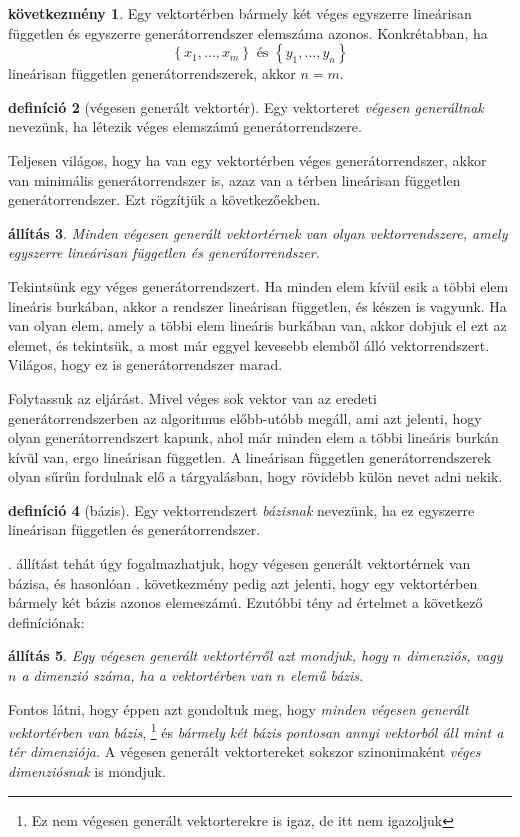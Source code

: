 \documentclass[9pt,showtrims]{memoir}
\makeatletter
\let\Aref\relax
\renewenvironment{proof}[1][\proofname]
    {\par\pushQED{\qed}%
    \normalfont \topsep6\p@\@plus6\p@\relax
    \trivlist
    \item[\hskip\labelsep
        \itshape
    #1\@addpunct{:}]\ignorespaces}
    {\popQED\endtrivlist\@endpefalse}
\theoremstyle{plain}
\newtheorem{proposition}{állítás}[chapter]
\theoremstyle{remark}
\theoremstyle{definition}
\newtheorem{definition}[proposition]{definíció}
\newtheorem{corollary}[proposition]{következmény}
\makeatother
\begin{document}
\begin{corollary}
    Egy vektortérben bármely két véges egyszerre lineárisan független és egyszerre generátorrendszer elemszáma azonos.
    Konkrétabban, ha
    \[
        \left\{ x_1,\dots,x_m \right\} \text{ és } \left\{ y_1,\dots,y_n \right\}
    \]
    lineárisan független generátorrendszerek, akkor $n=m$.
    \label{co:baziselemszam}
\end{corollary}
\begin{definition}[végesen generált vektortér]
    Egy vektorteret \emph{végesen generáltnak} nevezünk,
    ha létezik véges elemszámú generátorrendszere.
\end{definition}
Teljesen világos, hogy ha van egy vektortérben véges generátorrendszer,
akkor van minimális generátorrendszer is, azaz van a térben lineárisan független generátorrendszer.
Ezt rögzítjük a következőekben.
\begin{proposition}
    Minden végesen generált vektortérnek van olyan vektorrendszere, 
    amely egyszerre lineárisan független és generátorrendszer.
    \label{pr:bazisletezik}
\end{proposition}
\begin{proof}
    Tekintsünk egy véges generátorrendszert.
    Ha minden elem kívül esik a többi elem lineáris burkában, akkor a rendszer lineárisan független, és készen is vagyunk.
    Ha van olyan elem, amely a többi elem lineáris burkában van, akkor dobjuk el ezt az elemet, és tekintsük, a most már
    eggyel kevesebb elemből álló vektorrendszert. 
    Világos, hogy ez is generátorrendszer marad.

    Folytassuk az eljárást.
    Mivel véges sok vektor van az eredeti generátorrendszerben az algoritmus előbb-utóbb megáll,
    ami azt jelenti, hogy olyan generátorrendszert kapunk, 
    ahol már minden elem a többi lineáris burkán kívül van,
    ergo lineárisan független.
\end{proof}
A lineárisan független generátorrendszerek olyan sűrűn fordulnak elő a tárgyalásban,
hogy rövidebb külön nevet adni nekik.
\begin{definition}[bázis]
    Egy vektorrendszert \emph{bázisnak} nevezünk, ha ez egyszerre lineárisan független és generátorrendszer.
\end{definition}
\Aref{pr:bazisletezik}. állítást tehát úgy fogalmazhatjuk, hogy végesen generált vektortérnek van bázisa,
és hasonlóan . következmény pedig azt jelenti, 
hogy egy vektortérben bármely két bázis azonos elemeszámú.
Ezutóbbi tény ad értelmet a következő definíciónak:
\begin{proposition}
    Egy végesen generált vektortérről azt mondjuk, hogy $n$ dimenziós, vagy $n$ a dimenzió száma,
    ha a vektortérben van $n$ elemű bázis.
\end{proposition}
Fontos látni, hogy éppen azt gondoltuk meg, hogy \emph{minden végesen generált vektortérben van bázis}, 
\footnote{Ez nem végesen generált vektorterekre is igaz, de itt nem igazoljuk}
és \emph{bármely két bázis pontosan annyi vektorból áll mint a tér dimenziója.}
A végesen generált vektortereket sokszor szinonimaként \emph{véges dimenziósnak} is mondjuk.
\end{document}
